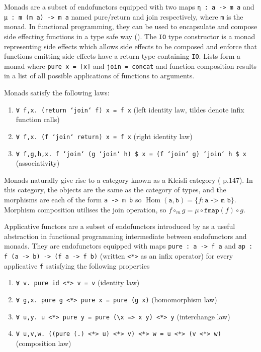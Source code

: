 \documentclass[11pt]{report}
\begin{document}
\begin{spacing}{1.15}
Monads are a subset of endofunctors equipped with two maps \texttt{η : a -> m a} and \texttt{μ : m (m a) -> m a} named pure/return and join respectively, where \texttt{m} is the monad. In functional programming, they can be used to encapsulate and compose side effecting functions in a type safe way (\cite{moggi1991notions}). The \texttt{IO} type constructor is a monad representing side effects which allows side effects to be composed and enforce that functions emitting side effects have a return type containing \texttt{IO}. Lists form a monad where \texttt{pure x = [x]} and \texttt{join = concat} and function composition results in a list of all possible applications of functions to arguments.

Monads satisfy the following laws:
\begin{enumerate}
	\item \texttt{∀ f,x. (return `join` f) x = f x} (left identity law, tildes denote infix function calls)
	\item \texttt{∀ f,x. (f `join` return) x = f x} (right identity law)
	\item \texttt{∀ f,g,h,x. f `join` (g `join` h) \$ x = (f `join` g) `join` h \$ x} (associativity)
\end{enumerate}

Monads naturally give rise to a category known as a Kleisli category (\cite{mac1970categories} p.147). In this category, the objects are the same as the category of types, and the morphisms are each of the form \texttt{a -> m b} so $\operatorname{Hom}(\texttt{a},\texttt{b})=\{ f : \texttt{a -> m b} \}$. Morphism composition utilises the join operation, so $f\circ_m g = \mu\circ \texttt{fmap}(f)\circ g$.

Applicative functors are a subset of endofunctors introduced by \cite{mcbride2008applicative} as a useful abstraction in functional programming intermediate between endofunctors and monads. They are endofunctors equipped with maps \texttt{pure : a -> f a} and \texttt{ap : f (a -> b) -> (f a -> f b)} (written \texttt{<*>} as an infix operator) for every applicative \texttt{f} satisfying the following properties

\begin{enumerate}
	\item \texttt{∀ v. pure id <*> v = v} (identity law)
	\item \texttt{∀ g,x. pure g <*> pure x = pure (g x)} (homomorphism law)
	\item \texttt{∀ u,y. u <*> pure y = pure (\textbackslash{}x => x y) <*> y} (interchange law)
	\item \texttt{∀ u,v,w. ((pure (.) <*> u) <*> v) <*> w = u <*> (v <*> w)} (composition law)
\end{enumerate}


\end{spacing}
\end{document}
